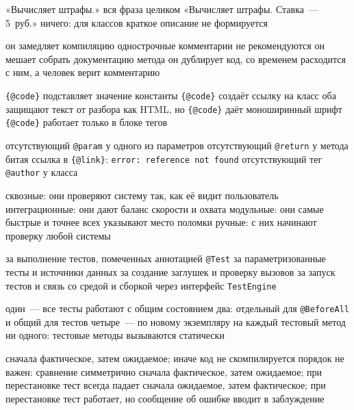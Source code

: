 \begin{enumerate}

  {«Вычисляет штрафы.»}
  {вся фраза целиком}
  {«Вычисляет штрафы. Ставка~--- 5~руб.»}
  {ничего: для классов краткое описание не формируется}

  {он замедляет компиляцию}
  {однострочные комментарии не рекомендуются}
  {он мешает собрать документацию метода}
  {он дублирует код, со временем расходится с ним, а человек верит комментарию}

  {\texttt{\{@code\}} подставляет значение константы}
  {\texttt{\{@code\}} создаёт ссылку на класс}
  {оба защищают текст от разбора как HTML, но \texttt{\{@code\}} даёт моноширинный шрифт}
  {\texttt{\{@code\}} работает только в блоке тегов}

  {отсутствующий \texttt{@param} у одного из параметров}
  {отсутствующий \texttt{@return} у метода}
  {битая ссылка в \texttt{\{@link\}}: \texttt{error: reference not found}}
  {отсутствующий тег \texttt{@author} у класса}

  {сквозные: они проверяют систему так, как её видит пользователь}
  {интеграционные: они дают баланс скорости и охвата}
  {модульные: они самые быстрые и точнее всех указывают место поломки}
  {ручные: с них начинают проверку любой системы}

  {за выполнение тестов, помеченных аннотацией \texttt{@Test}}
  {за параметризованные тесты и источники данных}
  {за создание заглушек и проверку вызовов}
  {за запуск тестов и связь со средой и сборкой через интерфейс \texttt{TestEngine}}

  {один~--- все тесты работают с общим состоянием}
  {два: отдельный для \texttt{@BeforeAll} и общий для тестов}
  {четыре~--- по новому экземпляру на каждый тестовый метод}
  {ни одного: тестовые методы вызываются статически}

  {сначала фактическое, затем ожидаемое; иначе код не скомпилируется}
  {порядок не важен: сравнение симметрично}
  {сначала фактическое, затем ожидаемое; при перестановке тест всегда падает}
  {сначала ожидаемое, затем фактическое; при перестановке тест работает, но сообщение об ошибке вводит в заблуждение}


\end{enumerate}

